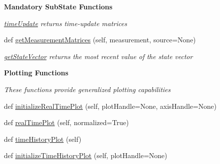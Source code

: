 \begin{Indent}{\bf Mandatory Sub\+State Functions}
\begin{DoxyCompactItemize}
\begin{DoxyCompactList}\small\item\em \hyperlink{classmodest_1_1substates_1_1substate_1_1SubState_a06d147fa5babe4e147b3267e67054ab4}{time\+Update} returns time-\/update matrices \end{DoxyCompactList}\item 
def \hyperlink{classmodest_1_1substates_1_1substate_1_1SubState_a98901b80c96264945362ec50b489a636}{get\+Measurement\+Matrices} (self, measurement, source=None)
\begin{DoxyCompactList}\small\item\em \hyperlink{classmodest_1_1substates_1_1substate_1_1SubState_a1d8050de59c58969164f577899a55aa2}{get\+State\+Vector} returns the most recent value of the state vector \end{DoxyCompactList}\end{DoxyCompactItemize}
\end{Indent}
\begin{Indent}{\bf Plotting Functions}\par
{\em These functions provide generalized plotting capabilities }\begin{DoxyCompactItemize}
\item 
def \hyperlink{classmodest_1_1substates_1_1substate_1_1SubState_a1adac64be88eab0a64bb952518c4268f}{initialize\+Real\+Time\+Plot} (self, plot\+Handle=None, axis\+Handle=None)
\item 
def \hyperlink{classmodest_1_1substates_1_1substate_1_1SubState_a2deb7d1ca3105eb20e50fa7e67298355}{real\+Time\+Plot} (self, normalized=True)
\item 
def \hyperlink{classmodest_1_1substates_1_1substate_1_1SubState_a643678c1193dd4029683a437e84229ac}{time\+History\+Plot} (self)
\item 
def \hyperlink{classmodest_1_1substates_1_1substate_1_1SubState_a1853d44036e3ed35ada02414ea29f8ab}{initialize\+Time\+History\+Plot} (self, plot\+Handle=None)
\end{DoxyCompactItemize}
\end{Indent}

